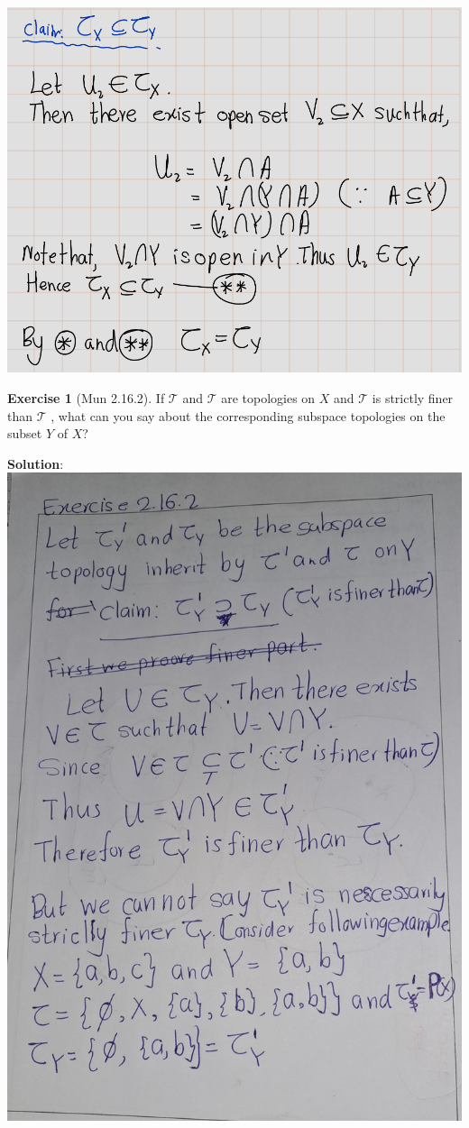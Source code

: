 \documentclass[
]{book}
\theoremstyle{definition}
\theoremstyle{definition}
\theoremstyle{definition}
\newtheorem{exercise}{Exercise}[chapter]
\theoremstyle{definition}
\theoremstyle{remark}
\begin{document}
\includegraphics{figures/Exercises/Ex 2.16/ex1-2.png}

\begin{exercise}[Mun 2.16.2]
\protect\hypertarget{exr:unnamed-chunk-92}{}\label{exr:unnamed-chunk-92}If \(\mathcal{T}\) and \(\mathcal{T}\) are topologies on \(X\) and \(\mathcal{T}\) is strictly finer than \(\mathcal{T}\) , what can you
say about the corresponding subspace topologies on the subset \(Y\) of \(X\)?
\end{exercise}

\textbf{Solution}:
\includegraphics{figures/Exercises/Ex 2.16/ex 2.jpg}
\end{document}
